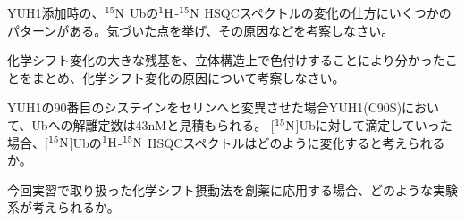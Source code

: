 \documentclass[a4paper,papersize,dvipdfmx]{jsarticle}
\begin{document}
\begin{tcolorbox}[colback=white,colbacktitle=black!10!white,coltitle=black,title={2}]
YUH1添加時の、$\rm ^{15}N$ Ubの$\rm ^1H$-$\rm ^{15}N$ HSQCスペクトルの変化の仕方にいくつかのパターンがある。気づいた点を挙げ、その原因などを考察しなさい。
\end{tcolorbox}



\begin{tcolorbox}[colback=white,colbacktitle=black!10!white,coltitle=black,title={3}]
化学シフト変化の大きな残基を、立体構造上で色付けすることにより分かったことをまとめ、化学シフト変化の原因について考察しなさい。
\end{tcolorbox}



\begin{tcolorbox}[colback=white,colbacktitle=black!10!white,coltitle=black,title={4}]
YUH1の90番目のシステインをセリンへと変異させた場合YUH1(C90S)において、Ubへの解離定数は43nMと見積もられる。
[$\rm ^{15}N$]Ubに対して滴定していった場合、[$\rm ^{15}N$]Ubの$\rm ^1H$-$\rm ^{15}N$ HSQCスペクトルはどのように変化すると考えられるか。
\end{tcolorbox}



\begin{tcolorbox}[colback=white,colbacktitle=black!10!white,coltitle=black,title={5}]
今回実習で取り扱った化学シフト摂動法を創薬に応用する場合、どのような実験系が考えられるか。
\end{tcolorbox}
\end{document}
